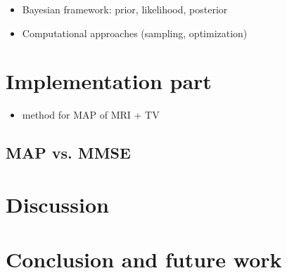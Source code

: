 \documentclass{article}
\begin{document}
\begin{itemize}
    \item Bayesian framework: prior, likelihood, posterior
    \item Computational approaches (sampling, optimization)
\end{itemize}

\section{Implementation part}

\begin{itemize}
    \item method for MAP of MRI + TV
\end{itemize}

\subsection{MAP vs. MMSE}

\section{Discussion}

\section{Conclusion and future work}
\end{document}
